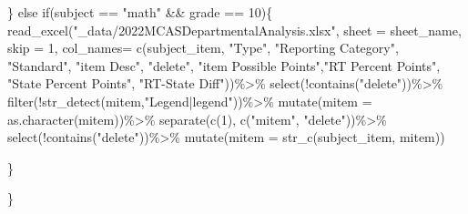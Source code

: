 \documentclass[
  letterpaper,
  DIV=11,
  numbers=noendperiod]{scrartcl}
\newenvironment{Shaded}{\begin{snugshade}}{\end{snugshade}}
\newcommand{\AttributeTok}[1]{\textcolor[rgb]{0.40,0.45,0.13}{#1}}
\newcommand{\ControlFlowTok}[1]{\textcolor[rgb]{0.00,0.23,0.31}{#1}}
\newcommand{\DecValTok}[1]{\textcolor[rgb]{0.68,0.00,0.00}{#1}}
\newcommand{\FunctionTok}[1]{\textcolor[rgb]{0.28,0.35,0.67}{#1}}
\newcommand{\NormalTok}[1]{\textcolor[rgb]{0.00,0.23,0.31}{#1}}
\newcommand{\SpecialCharTok}[1]{\textcolor[rgb]{0.37,0.37,0.37}{#1}}
\newcommand{\StringTok}[1]{\textcolor[rgb]{0.13,0.47,0.30}{#1}}
\begin{document}
\begin{Shaded}
\begin{Highlighting}[]
\NormalTok{  \}}
  \ControlFlowTok{else} \ControlFlowTok{if}\NormalTok{(subject }\SpecialCharTok{==} \StringTok{"math"} \SpecialCharTok{\&\&}\NormalTok{ grade }\SpecialCharTok{==} \DecValTok{10}\NormalTok{)\{}
     \FunctionTok{read\_excel}\NormalTok{(}\StringTok{"\_data/2022MCASDepartmentalAnalysis.xlsx"}\NormalTok{, }\AttributeTok{sheet =}\NormalTok{ sheet\_name, }
              \AttributeTok{skip =} \DecValTok{1}\NormalTok{, }\AttributeTok{col\_names=} \FunctionTok{c}\NormalTok{(subject\_item, }\StringTok{"Type"}\NormalTok{, }\StringTok{"Reporting Category"}\NormalTok{, }\StringTok{"Standard"}\NormalTok{, }\StringTok{"item Desc"}\NormalTok{, }\StringTok{"delete"}\NormalTok{, }\StringTok{"item Possible Points"}\NormalTok{,}\StringTok{"RT Percent Points"}\NormalTok{, }\StringTok{"State Percent Points"}\NormalTok{, }\StringTok{"RT{-}State Diff"}\NormalTok{))}\SpecialCharTok{\%\textgreater{}\%}
                   \FunctionTok{select}\NormalTok{(}\SpecialCharTok{!}\FunctionTok{contains}\NormalTok{(}\StringTok{"delete"}\NormalTok{))}\SpecialCharTok{\%\textgreater{}\%}
                   \FunctionTok{filter}\NormalTok{(}\SpecialCharTok{!}\FunctionTok{str\_detect}\NormalTok{(mitem,}\StringTok{"Legend|legend"}\NormalTok{))}\SpecialCharTok{\%\textgreater{}\%}
     \FunctionTok{mutate}\NormalTok{(}\AttributeTok{mitem =} \FunctionTok{as.character}\NormalTok{(mitem))}\SpecialCharTok{\%\textgreater{}\%}
     \FunctionTok{separate}\NormalTok{(}\FunctionTok{c}\NormalTok{(}\DecValTok{1}\NormalTok{), }\FunctionTok{c}\NormalTok{(}\StringTok{"mitem"}\NormalTok{, }\StringTok{"delete"}\NormalTok{))}\SpecialCharTok{\%\textgreater{}\%}
   \FunctionTok{select}\NormalTok{(}\SpecialCharTok{!}\FunctionTok{contains}\NormalTok{(}\StringTok{"delete"}\NormalTok{))}\SpecialCharTok{\%\textgreater{}\%}
    \FunctionTok{mutate}\NormalTok{(}\AttributeTok{mitem =}
             \FunctionTok{str\_c}\NormalTok{(subject\_item, mitem))}
     
\NormalTok{   \}}
    
\NormalTok{\}}
\end{Highlighting}
\end{Shaded}
\end{document}
